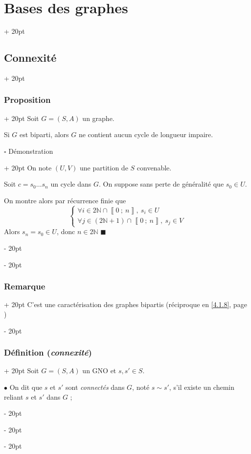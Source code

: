 \documentclass[a4paper, 12pt, twoside]{article}
\newcommand{\N}{\mathbb{N}} %
\newcommand{\nset}[2]{\left\llbracket #1\ ;\ #2 \right\rrbracket}
\newcommand{\ind}[1][20pt]{\advance\leftskip + #1}
\newcommand{\deind}[1][20pt]{\advance\leftskip - #1}
\newenvironment{indt}[2][20pt]{#2 \par \ind[#1]}{\par \deind} %
\begin{document}
\begin{indt}{\section{Bases des graphes}}
\begin{indt}{\subsection{Connexité}}
\begin{indt}{\subsubsection{Proposition}}
                Soit $G = (S, A)$ un graphe.

                Si $G$ est biparti, alors $G$ ne contient aucun cycle de longueur impaire.

                \begin{indt}{$\square$ Démonstration}
                    On note $(U, V)$ une partition de $S$ convenable.

                    Soit $c = s_0 \ldots s_n$ un cycle dans $G$.
                    On suppose sans perte de généralité que $s_0 \in U$.

                    On montre alors par récurrence finie que
                    \[
                        \begin{cases}
                            \forall i \in 2\N \cap \nset 0 n,\ s_i \in U
                            \\
                            \forall j \in (2\N + 1) \cap \nset 0 n,\ s_j \in V
                        \end{cases}
                    \]
                    Alors $s_n = s_0 \in U$, donc $n \in 2\N$ $\blacksquare$
                \end{indt}
            \end{indt}

            \vspace{12pt}
            
            \begin{indt}{\subsubsection{Remarque}}
                C'est une caractérisation des graphes bipartis (réciproque en \ref{4.1.8}, page \pageref{4.1.8})
            \end{indt}

            \vspace{12pt}
            
            \begin{indt}{\subsubsection{Définition (\textit{connexité})}}
                Soit $G = (S, A)$ un GNO et $s, s' \in S$.

                $\bullet$ On dit que $s$ et $s'$ sont \textit{connectés} dans $G$, noté
                $s \sim s'$, s'il existe un chemin reliant $s$ et $s'$ dans $G$ ;


\end{indt}
\end{indt}
\end{indt}
\end{document}
